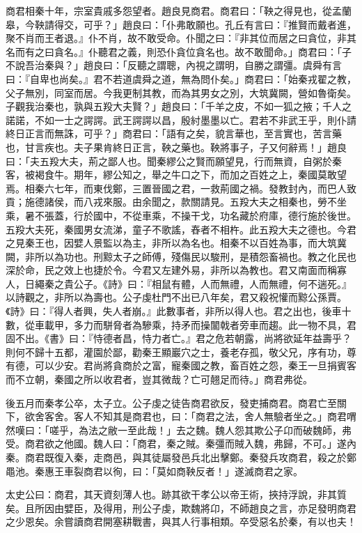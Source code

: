 \begin{pinyinscope}
商君相秦十年，宗室貴戚多怨望者。趙良見商君。商君曰：「鞅之得見也，從孟蘭皋，今鞅請得交，可乎？」趙良曰：「仆弗敢願也。孔丘有言曰：『推賢而戴者進，聚不肖而王者退。』仆不肖，故不敢受命。仆聞之曰：『非其位而居之曰貪位，非其名而有之曰貪名。』仆聽君之義，則恐仆貪位貪名也。故不敢聞命。」商君曰：「子不說吾治秦與？」趙良曰：「反聽之謂聰，內視之謂明，自勝之謂彊。虞舜有言曰：『自卑也尚矣。』君不若道虞舜之道，無為問仆矣。」商君曰：「始秦戎翟之教，父子無別，同室而居。今我更制其教，而為其男女之別，大筑冀闕，營如魯衛矣。子觀我治秦也，孰與五羖大夫賢？」趙良曰：「千羊之皮，不如一狐之掖；千人之諾諾，不如一士之諤諤。武王諤諤以昌，殷紂墨墨以亡。君若不非武王乎，則仆請終日正言而無誅，可乎？」商君曰：「語有之矣，貌言華也，至言實也，苦言藥也，甘言疾也。夫子果肯終日正言，鞅之藥也。鞅將事子，子又何辭焉！」趙良曰：「夫五羖大夫，荊之鄙人也。聞秦繆公之賢而願望見，行而無資，自粥於秦客，被褐食牛。期年，繆公知之，舉之牛口之下，而加之百姓之上，秦國莫敢望焉。相秦六七年，而東伐鄭，三置晉國之君，一救荊國之禍。發教封內，而巴人致貢；施德諸侯，而八戎來服。由余聞之，款關請見。五羖大夫之相秦也，勞不坐乘，暑不張蓋，行於國中，不從車乘，不操干戈，功名藏於府庫，德行施於後世。五羖大夫死，秦國男女流涕，童子不歌謠，舂者不相杵。此五羖大夫之德也。今君之見秦王也，因嬖人景監以為主，非所以為名也。相秦不以百姓為事，而大筑冀闕，非所以為功也。刑黥太子之師傅，殘傷民以駿刑，是積怨畜禍也。教之化民也深於命，民之效上也捷於令。今君又左建外易，非所以為教也。君又南面而稱寡人，日繩秦之貴公子。《詩》曰：『相鼠有體，人而無禮，人而無禮，何不遄死。』以詩觀之，非所以為壽也。公子虔杜門不出已八年矣，君又殺祝懽而黥公孫賈。《詩》曰：『得人者興，失人者崩。』此數事者，非所以得人也。君之出也，後車十數，從車載甲，多力而駢脅者為驂乘，持矛而操闟戟者旁車而趨。此一物不具，君固不出。《書》曰：『恃德者昌，恃力者亡。』君之危若朝露，尚將欲延年益壽乎？則何不歸十五都，灌園於鄙，勸秦王顯巖穴之士，養老存孤，敬父兄，序有功，尊有德，可以少安。君尚將貪商於之富，寵秦國之教，畜百姓之怨，秦王一旦捐賓客而不立朝，秦國之所以收君者，豈其微哉？亡可翹足而待。」商君弗從。

後五月而秦孝公卒，太子立。公子虔之徒告商君欲反，發吏捕商君。商君亡至關下，欲舍客舍。客人不知其是商君也，曰：「商君之法，舍人無驗者坐之。」商君喟然嘆曰：「嗟乎，為法之敝一至此哉！」去之魏。魏人怨其欺公子卬而破魏師，弗受。商君欲之他國。魏人曰：「商君，秦之賊。秦彊而賊入魏，弗歸，不可。」遂內秦。商君既復入秦，走商邑，與其徒屬發邑兵北出擊鄭。秦發兵攻商君，殺之於鄭黽池。秦惠王車裂商君以徇，曰：「莫如商鞅反者！」遂滅商君之家。

太史公曰：商君，其天資刻薄人也。跡其欲干孝公以帝王術，挾持浮說，非其質矣。且所因由嬖臣，及得用，刑公子虔，欺魏將卬，不師趙良之言，亦足發明商君之少恩矣。余嘗讀商君開塞耕戰書，與其人行事相類。卒受惡名於秦，有以也夫！


\end{pinyinscope}